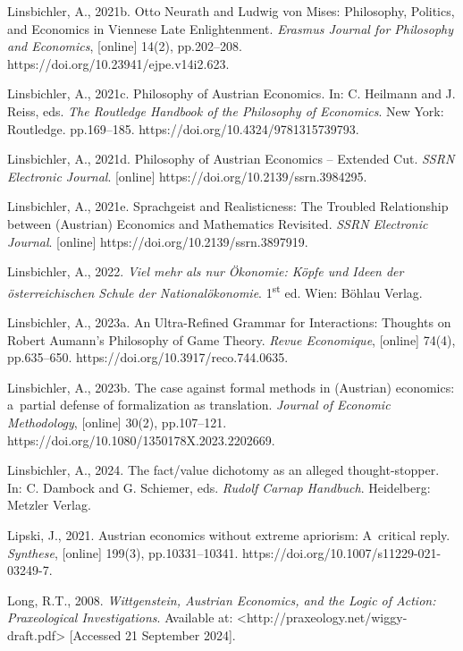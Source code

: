Linsbichler, A., 2021b. Otto Neurath and Ludwig von Mises: Philosophy, Politics, and Economics in Viennese Late Enlightenment. \textit{Erasmus Journal for Philosophy and Economics}, [online] 14(2), pp.202–208. https://doi.org/10.23941/ejpe.v14i2.623.



Linsbichler, A., 2021c. Philosophy of Austrian Economics. In: C. Heilmann and J. Reiss, eds. \textit{The Routledge Handbook of the Philosophy of Economics}. New York: Routledge. pp.169–185. https://doi.org/10.4324/9781315739793.



Linsbichler, A., 2021d. Philosophy of Austrian Economics -- Extended Cut. \textit{SSRN Electronic Journal}. [online] https://doi.org/10.2139/ssrn.3984295.



Linsbichler, A., 2021e. Sprachgeist and Realisticness: The Troubled Relationship between (Austrian) Economics and Mathematics Revisited. \textit{SSRN Electronic Journal}. [online] https://doi.org/10.2139/ssrn.3897919.



Linsbichler, A., 2022. \textit{Viel mehr als nur Ökonomie: Köpfe und Ideen der österreichischen Schule der Nationalökonomie}. 1\textsuperscript{st} ed. Wien: Böhlau Verlag.



Linsbichler, A., 2023a. An Ultra-Refined Grammar for Interactions: Thoughts on Robert Aumann's Philosophy of Game Theory. \textit{Revue Economique}, [online] 74(4), pp.635–650. https://doi.org/10.3917/reco.744.0635.



Linsbichler, A., 2023b. The case against formal methods in (Austrian) economics: a~partial defense of formalization as translation. \textit{Journal of Economic Methodology}, [online] 30(2), pp.107–121. https://doi.org/10.1080/1350178X.2023.2202669.



Linsbichler, A., 2024. The fact/value dichotomy as an alleged thought-stopper. In: C. Dambock and G. Schiemer, eds. \textit{Rudolf Carnap Handbuch}. Heidelberg: Metzler Verlag.



Lipski, J., 2021. Austrian economics without extreme apriorism: A~critical reply. \textit{Synthese}, [online] 199(3), pp.10331–10341. https://doi.org/10.1007/s11229-021-03249-7.



Long, R.T., 2008. \textit{Wittgenstein, Austrian Economics, and the Logic of Action: Praxeological Investigations}. Available at: {\textless}http://praxeology.net/wiggy-draft.pdf{\textgreater} [Accessed 21 September 2024].



